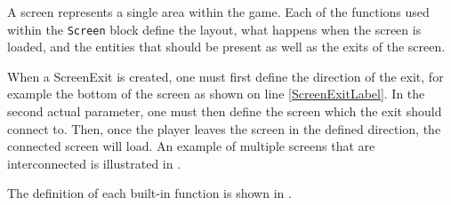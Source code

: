 A screen represents a single area within the game. Each of the functions used within the \texttt{Screen} block define the layout, what happens when the screen is loaded, and the entities that should be present as well as the exits of the screen.

When a ScreenExit is created, one must first define the direction of the exit, for example the bottom of the screen as shown on line \ref{ScreenExitLabel}.
In the second actual parameter, one must then define the screen which the exit should connect to.
Then, once the player leaves the screen in the defined direction, the connected screen will load. An example of multiple screens that are interconnected is illustrated in .


The definition of each built-in function is shown in .










